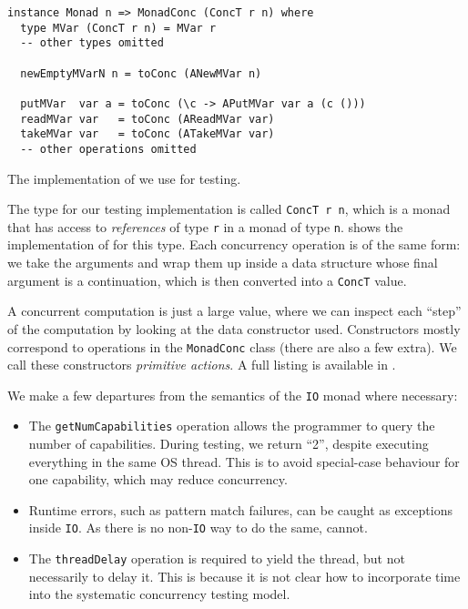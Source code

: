 \begin{listing}
  \begin{verbatim}
instance Monad n => MonadConc (ConcT r n) where
  type MVar (ConcT r n) = MVar r
  -- other types omitted

  newEmptyMVarN n = toConc (ANewMVar n)

  putMVar  var a = toConc (\c -> APutMVar var a (c ()))
  readMVar var   = toConc (AReadMVar var)
  takeMVar var   = toConc (ATakeMVar var)
  -- other operations omitted
  \end{verbatim}
  \caption{The implementation of  we use for testing.}\label{lst:mvarops}
\end{listing}

The type for our testing implementation is called \verb|ConcT r n|, which is a
monad that has access to \emph{references} of type \verb|r| in a monad of type
\verb|n|.   shows the implementation of  for
this type.  Each concurrency operation is of the same form: we take the
arguments and wrap them up inside a data structure whose final argument is a
continuation, which is then converted into a \verb|ConcT| value.

A concurrent computation is just a large value, where we can inspect each
``step'' of the computation by looking at the data constructor used.
Constructors mostly correspond to operations in the \verb|MonadConc| class
(there are also a few extra).  We call these constructors \emph{primitive
  actions}.  A full listing is available in .

We make a few departures from the semantics of the \verb|IO| monad where
necessary:

\begin{itemize}
\item The \verb|getNumCapabilities| operation allows the programmer to query the
  number of capabilities.  During testing, we return ``2'', despite executing
  everything in the same OS thread.  This is to avoid special-case behaviour for
  one capability, which may reduce concurrency.
\item Runtime errors, such as pattern match failures, can be caught as
  exceptions inside \verb|IO|.  As there is no non-\verb|IO| way to do the same,
  \dejafu{} cannot.
\item The \verb|threadDelay| operation is required to yield the thread, but not
  necessarily to delay it.  This is because it is not clear how to incorporate
  time into the systematic concurrency testing model.
\end{itemize}

